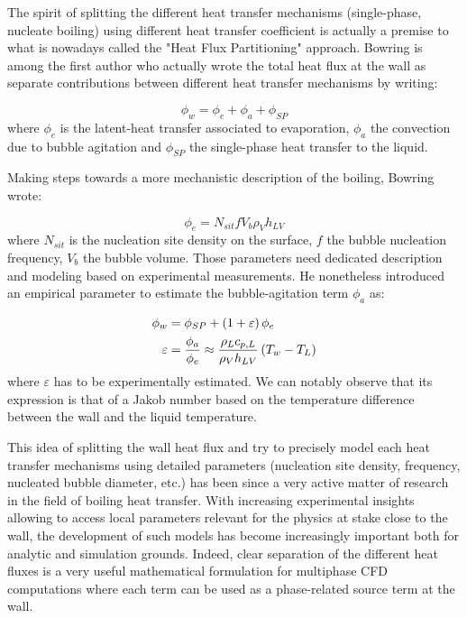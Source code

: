 The spirit of splitting the different heat transfer mechanisms (single-phase, nucleate boiling) using different heat transfer coefficient is actually a premise to what is nowadays called the "Heat Flux Partitioning" approach. Bowring \cite{bowring} is among the first author who actually wrote the total heat flux at the wall as separate contributions between different heat transfer mechanisms by writing:

\begin{equation}
\phi_{w} = \phi_{e} + \phi_{a} + \phi_{SP}
\end{equation}
where $\phi_{e}$ is the latent-heat transfer associated to evaporation, $\phi_{a}$ the convection due to bubble agitation and $\phi_{SP}$ the single-phase heat transfer to the liquid. 

\npar

Making steps towards a more mechanistic description of the boiling, Bowring wrote:

\begin{equation}
\phi_{e} = N_{sit} f V_{b} \rho_{V} h_{LV}
\end{equation}
where $N_{sit}$ is the nucleation site density on the surface, $f$ the bubble nucleation frequency, $V_{b}$ the bubble volume. Those parameters need dedicated description and modeling based on experimental measurements. He nonetheless introduced an empirical parameter to estimate the bubble-agitation term $\phi_{a}$ as:

\begin{align}
\phi_{w} &= \phi_{SP} + \left( 1+\varepsilon \right)\phi_{e}\\
\varepsilon &= \dfrac{\phi_{a}}{\phi_{e}} \approx \frac{\rho_{L}c_{p,L}}{\rho_{V}h_{LV}} \left( T_{w} - T_{L} \right)
\end{align}
where $\varepsilon$ has to be experimentally estimated. We can notably observe that its expression is that of a Jakob number based on the temperature difference between the wall and the liquid temperature.

\npar

This idea of splitting the wall heat flux and try to precisely model each heat transfer mechanisms using detailed parameters (nucleation site density, frequency, nucleated bubble diameter, etc.) has been since a very active matter of research in the field of boiling heat transfer. With increasing experimental insights allowing to access local parameters relevant for the physics at stake close to the wall, the development of such models has become increasingly important both for analytic and simulation grounds. Indeed, clear separation of the different heat fluxes is a very useful mathematical formulation for multiphase CFD computations where each term can be used as a phase-related source term at the wall. 

